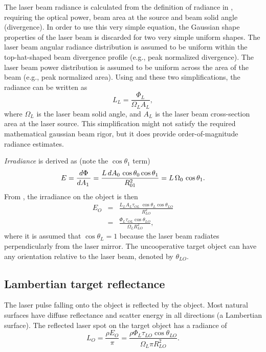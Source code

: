The laser beam radiance is calculated from the definition of radiance in , requiring the optical power, beam area at the source and beam solid angle (divergence).  In order to use this very simple equation, the Gaussian shape properties of the laser beam is discarded for two very simple uniform shapes.
The laser beam angular radiance distribution is assumed to be uniform within the top-hat-shaped beam divergence profile (e.g., peak normalized divergence). The laser beam power distribution is assumed to be uniform across the area of the beam (e.g., peak normalized area). Using  and these two simplifications, the radiance can be written as
\begin{equation}
L_L=\frac{\Phi_L}{\Omega_L A_L},\label{fig:laserrangeirrad}
\end{equation}
where $\Omega_L$ is the laser beam solid angle, and $A_L$ is the laser beam cross-section area at the laser source. This simplification might not satisfy the required mathematical gaussian beam rigor, but it does provide order-of-magnitude radiance estimates.

\textit{Irradiance} is derived as (note the $\cos\theta_1$ term)
\begin{equation}
E=\frac{d{}\Phi}{d{}A_1\,}=
\frac{L\,d{}A_0\,\cos\theta_0\cos\theta_1}{R_{01}^2}=L\,\Omega_0\,\cos\theta_1.
\label{irradef}
\end{equation}
From , the irradiance on the object is then 
\begin{eqnarray}
E_O&=&\frac{L_L A_L \tau_{OL}\;\cos\theta_L\cos\theta_{LO}}{R^2_{LO}}\nonumber\\
&=&\frac{\Phi_L \tau_{OL}\cos\theta_{LO}}{\Omega_L R^2_{LO}},
\end{eqnarray}
where it is assumed that $\cos\theta_{L}=1$ because the laser beam radiates perpendicularly from the laser mirror. The uncooperative target object can have any orientation relative to the laser beam, denoted by $\theta_{LO}$.


\subsection{Lambertian target reflectance}
\noindent
The laser pulse falling onto the object is reflected by the object. Most
natural surfaces have diffuse reflectance and scatter energy in all
directions (a Lambertian surface). The reflected laser spot on the target object has a radiance of
\begin{equation}
L_O=\frac{\rho E_O}{\pi}=\frac{\rho\Phi_L \tau_{LO}\cos\theta_{LO}}{\Omega_L
\pi R^2_{LO}}.\label{loo}
\end{equation}


